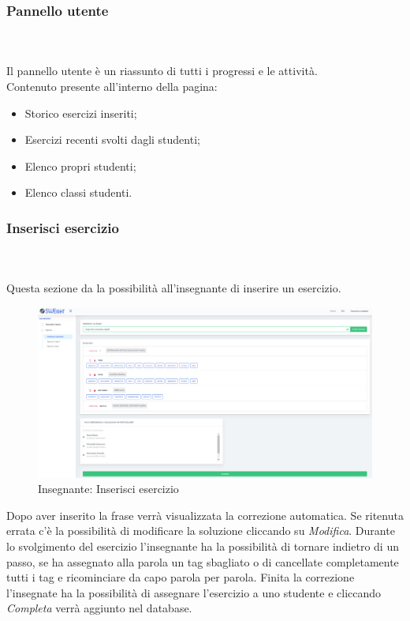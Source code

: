         
        
        \subsubsection{Pannello utente}\mbox{}\\ \\
          Il pannello utente è un riassunto di tutti i progressi e le attività.
         \\Contenuto presente all'interno della pagina:
        	\begin{itemize}
        	\item Storico esercizi inseriti; 
        	\item Esercizi recenti svolti dagli studenti;
        	\item Elenco propri studenti;
        	\item Elenco classi studenti.
        	\end{itemize}
        
        
        
        
        \subsubsection{Inserisci esercizio}\mbox{}\\ \\
          Questa sezione da la possibilità all'insegnante di inserire un esercizio.
        	\begin{figure}[H]
            \centering
        	\includegraphics[width=17cm]{sez/img/insegnante/inserisciEsercizio.PNG} 
            \caption{Insegnante: Inserisci esercizio}\label{fig:1}
        	\end{figure}
        
          Dopo aver inserito la frase verrà visualizzata la correzione automatica. Se ritenuta errata c'è la possibilità di modificare la soluzione cliccando su \textit{Modifica}. Durante lo svolgimento del esercizio l'insegnante ha la possibilità di tornare indietro di un passo, se ha assegnato alla parola un tag sbagliato o di cancellate completamente tutti i tag e ricominciare da capo parola per parola. Finita la correzione l'insegnate ha la possibilità di assegnare l'esercizio a uno studente e cliccando \textit{Completa} verrà aggiunto nel database.
        

